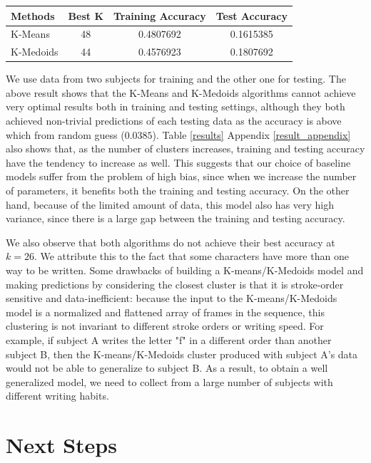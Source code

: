 \documentclass{article}
\begin{document}
\begin{table}[ht]
\centering
\begin{tabular}{|l | c c c |}
\hline
Methods       & Best K & Training Accuracy & Test Accuracy   \\ \hline \hline
K-Means       & 48     & 0.4807692         & 0.1615385      \\ 
K-Medoids     & 44     & 0.4576923         & 0.1807692      \\ \hline
\end{tabular}
\centering
\end{table}

We use data from two subjects for training and the other one for testing. The above result shows that the K-Means and K-Medoids algorithms cannot achieve very optimal results both in training and testing settings, although they both achieved non-trivial predictions of each testing data as the accuracy is above which from random guess ($0.0385$). Table \ref{results} Appendix \ref{result_appendix} also shows that, as the number of clusters increases, training and testing accuracy have the tendency to increase as well. This suggests that our choice of baseline models suffer from the problem of high bias, since when we increase the number of parameters, it benefits both the training and testing accuracy. On the other hand, because of the limited amount of data, this model also has very high variance, since there is a large gap between the training and testing accuracy.

We also observe that both algorithms do not achieve their best accuracy at $k = 26$. We attribute this to the fact that some characters have more than one way to be written. Some drawbacks of building a K-means/K-Medoids model and making predictions by considering the closest cluster is that it is stroke-order sensitive and data-inefficient: because the input to the K-means/K-Medoids model is a normalized and flattened array of frames in the sequence, this clustering is not invariant to different stroke orders or writing speed. For example, if subject A writes the letter "f" in a different order than another subject B, then the K-means/K-Medoids cluster produced with subject A's data would not be able to generalize to subject B. As a result, to obtain a well generalized model, we need to collect from a large number of subjects with different writing habits.


\section{Next Steps}
\end{document}
